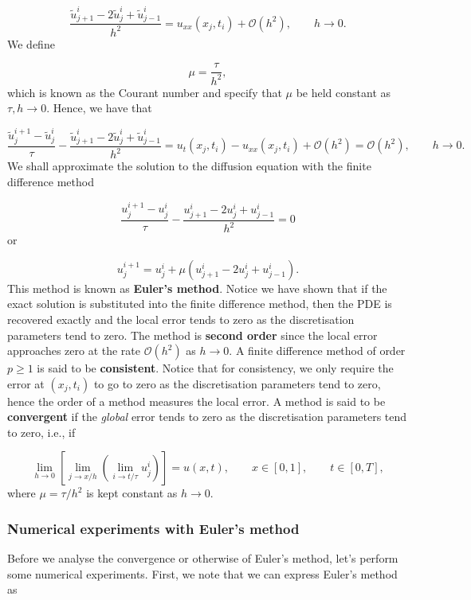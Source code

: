 \documentclass[12pt,a4paper]{article}
\begin{document}
\[
\frac{\tilde{u}^{i}_{j+1} - 2\tilde{u}^i_j + \tilde{u}^i_{j-1}}{h^2} = u_{xx}(x_j,t_i) + \mathcal{O}(h^2), \qquad h \to 0.
\]
We define

\[
\mu = \frac{\tau}{h^2},
\]
which is known as the Courant number and specify that $\mu$ be held constant as $\tau, h \to 0$. Hence, we have that

\[
\frac{\tilde{u}^{i+1}_j - \tilde{u}^i_j}{\tau} - \frac{\tilde{u}^{i}_{j+1} - 2\tilde{u}^i_j + \tilde{u}^i_{j-1}}{h^2} = u_t(x_j,t_i) - u_{xx}(x_j,t_i) + \mathcal{O}(h^2) =  \mathcal{O}(h^2), \qquad h \to 0.
\]
We shall approximate the solution to the diffusion equation with the finite difference method

\[
\frac{u^{i+1}_j - u^i_j}{\tau} - \frac{u^{i}_{j+1} - 2u^i_j + u^i_{j-1}}{h^2} = 0
\]
or

\[
u^{i+1}_j = u^i_j + \mu \left( u^{i}_{j+1} - 2u^i_j + u^i_{j-1}  \right).
\]
This method is known as \textbf{Euler's method}. Notice we have shown that if the exact solution is substituted into the finite difference method, then the PDE is recovered exactly and the local error tends to zero as the discretisation parameters tend to zero.  The method is \textbf{second order} since the local error approaches zero at the rate $\mathcal{O}(h^2)$ as $h \to 0$. A finite difference method of order $p \geq 1$ is said to be \textbf{consistent}.  Notice that for consistency, we only require the error at $(x_j,t_i)$  to go to zero as the discretisation parameters tend to zero, hence the order of a method measures the local error.  A method is said to be \textbf{convergent} if the \emph{global} error tends to zero as the discretisation parameters tend to zero, i.e., if

\[
\lim_{h \to 0}\left[\lim_{j \to x/h}\left( \lim_{i \to t/\tau} u^i_j \right)   \right] = u(x,t), \qquad x \in [0, 1], \qquad t \in [0, T],
\]
where $\mu = \tau/h^2$ is kept constant as $h \to 0$.

\subsubsection{Numerical experiments with Euler's method}
Before we analyse the convergence or otherwise of Euler's method, let's perform some numerical experiments.  First, we note that we can express Euler's method as
\end{document}
